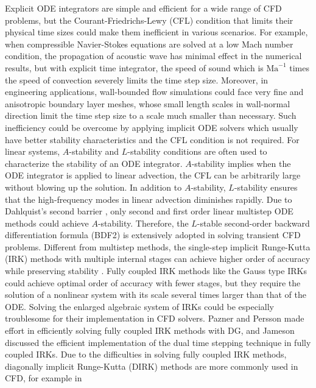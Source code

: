Explicit ODE integrators
are simple and efficient for a wide range of
CFD problems, but the Courant-Friedrichs-Lewy (CFL) condition
that limits their physical time sizes
could make them inefficient in various
scenarios.
For example,
when compressible Navier-Stokes equations are solved at a low Mach number condition,
the propagation of acoustic wave has minimal effect in the numerical results,
but with explicit time integrator,
the speed of sound which is $\text{Ma}^{-1}$ times the
speed of convection
severely limits the time step size.
Moreover, in engineering applications,
wall-bounded flow simulations could face
very fine and anisotropic boundary layer meshes,
whose small length scales in wall-normal direction limit the time step size
to a scale much smaller than necessary.
Such inefficiency could be overcome by
applying implicit ODE solvers which
usually have better stability characteristics
and the CFL condition is not required.
For linear systems, $A$-stability and $L$-stability conditions \cite{wanner1996solving}
are often used to characterize the stability of an ODE integrator.
$A$-stability \cite{dahlquist1963special} implies
when the ODE integrator is applied to linear advection,
the CFL can be arbitrarily large without blowing up the solution.
In addition to $A$-stability, $L$-stability ensures that the high-frequency
modes in linear advection diminishes rapidly.
Due to Dahlquist's second barrier
\cite{dahlquist1963special},
only second and first order linear multistep ODE methods
could achieve $A$-stability.
Therefore,
the $L$-stable
second-order backward differentiation formula (BDF2)
is extensively adopted in solving transient CFD problems.
Different from multistep methods,
the single-step implicit Runge-Kutta (IRK) methods
with multiple internal stages
can achieve higher order of accuracy while
preserving stability \cite{butcher2016ODEBook}.
Fully coupled IRK methods like the Gauss type IRKs
could achieve optimal order of accuracy
with fewer stages,
but they require the solution of a nonlinear
system with its scale several times larger
than that of the ODE.
Solving the enlarged algebraic system of IRKs
could be especially troublesome for their implementation in
CFD solvers.
Pazner and Persson
\cite{pazner2017stage}
made effort in efficiently solving
fully coupled IRK methods with DG, and
Jameson \cite{jameson2017evaluation}
discussed the efficient implementation of the dual time stepping
technique in fully coupled IRKs.
Due to the difficulties in solving
fully coupled IRK methods,
diagonally implicit Runge-Kutta (DIRK)
methods are more commonly used in CFD, for example in
